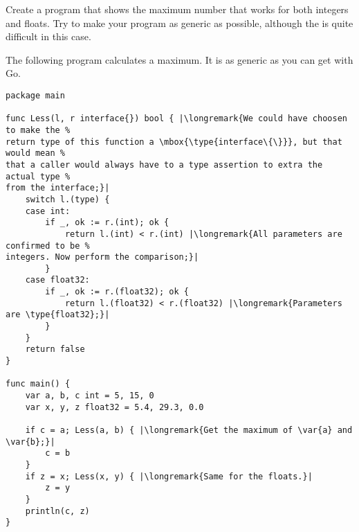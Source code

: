 \begin{Exercise}[title={Interfaces and max()},difficulty=5]
\Question
Create a program that shows the maximum number that works for both integers and floats.
Try to make your program as generic as possible, although the is quite difficult in
this case.
\end{Exercise}

\begin{Answer}
\Question
The following program calculates a maximum. It is as generic as you can get
with Go.

\begin{lstlisting}[caption=Generic way of calculating a maximum]
package main

func Less(l, r interface{}) bool { |\longremark{We could have choosen to make the %
return type of this function a \mbox{\type{interface\{\}}}, but that would mean %
that a caller would always have to a type assertion to extra the actual type %
from the interface;}|
	switch l.(type) {
	case int:
		if _, ok := r.(int); ok {
			return l.(int) < r.(int) |\longremark{All parameters are confirmed to be %
integers. Now perform the comparison;}|
		}
	case float32:
		if _, ok := r.(float32); ok {
			return l.(float32) < r.(float32) |\longremark{Parameters are \type{float32};}|
		}
	}
	return false
}

func main() {
	var a, b, c int = 5, 15, 0
	var x, y, z float32 = 5.4, 29.3, 0.0

	if c = a; Less(a, b) { |\longremark{Get the maximum of \var{a} and \var{b};}|
		c = b
	}
	if z = x; Less(x, y) { |\longremark{Same for the floats.}|
		z = y
	}
	println(c, z)
}
\end{lstlisting}
\showremarks
\end{Answer}

